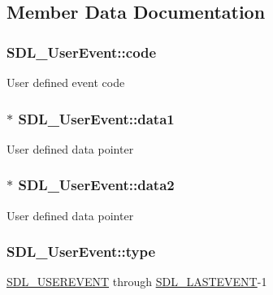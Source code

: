 \subsection{Member Data Documentation}
\hypertarget{struct_s_d_l___user_event_aef47976781ee82b527a353c5acfa0a34}{}
\subsubsection[{code}]{ S\+D\+L\+\_\+\+User\+Event\+::code}\label{struct_s_d_l___user_event_aef47976781ee82b527a353c5acfa0a34}
User defined event code \hypertarget{struct_s_d_l___user_event_ab2893a12be2f97195f16463a23107913}{}
\subsubsection[{data1}]{$\ast$ S\+D\+L\+\_\+\+User\+Event\+::data1}\label{struct_s_d_l___user_event_ab2893a12be2f97195f16463a23107913}
User defined data pointer \hypertarget{struct_s_d_l___user_event_aae4dbf65c34d654c9edf519eb061b7cf}{}
\subsubsection[{data2}]{$\ast$ S\+D\+L\+\_\+\+User\+Event\+::data2}\label{struct_s_d_l___user_event_aae4dbf65c34d654c9edf519eb061b7cf}
User defined data pointer \hypertarget{struct_s_d_l___user_event_ab7afa8b98dbd7b52bef41155e10f7340}{}
\subsubsection[{type}]{ S\+D\+L\+\_\+\+User\+Event\+::type}\label{struct_s_d_l___user_event_ab7afa8b98dbd7b52bef41155e10f7340}
\hyperlink{_s_d_l__events_8h_a3b589e89be6b35c02e0dd34a55f3fccaa4364c23f54802309e83fdb9b1c07c719}{S\+D\+L\+\_\+\+U\+S\+E\+R\+E\+V\+E\+N\+T} through \hyperlink{_s_d_l__events_8h_a3b589e89be6b35c02e0dd34a55f3fccaaffeac40a4ff366717c0ebc74118ea2ae}{S\+D\+L\+\_\+\+L\+A\+S\+T\+E\+V\+E\+N\+T}-\/1 \hypertarget{struct_s_d_l___user_event_abccefa10e0e0e3a0801bc6d836a08da7}{}
